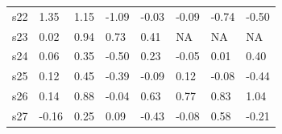 \begin{table}[]
\begin{tabular}{llllllll}
s22 & \cellcolor[HTML]{9B9B9B}1.35                                  & \cellcolor[HTML]{9B9B9B}1.15                                 & -1.09                                                                   & -0.03                        & -0.09                                                            & -0.74                                                                & -0.50                                                                      \\
s23 & \cellcolor[HTML]{EFEFEF}0.02                                  & \cellcolor[HTML]{9B9B9B}0.94                                 & \cellcolor[HTML]{9B9B9B}0.73                                            & \cellcolor[HTML]{C0C0C0}0.41 & NA                                                               & NA                                                                   & NA                                                                         \\
s24 & \cellcolor[HTML]{EFEFEF}0.06                                  & \cellcolor[HTML]{C0C0C0}0.35                                 & -0.50                                                                   & \cellcolor[HTML]{C0C0C0}0.23 & -0.05                                                            & \cellcolor[HTML]{EFEFEF}0.01                                         & \cellcolor[HTML]{C0C0C0}0.40                                               \\
s25 & \cellcolor[HTML]{C0C0C0}0.12                                  & \cellcolor[HTML]{C0C0C0}0.45                                 & -0.39                                                                   & -0.09                        & \cellcolor[HTML]{C0C0C0}0.12                                     & -0.08                                                                & -0.44                                                                      \\
s26 & \cellcolor[HTML]{C0C0C0}0.14                                  & \cellcolor[HTML]{9B9B9B}0.88                                 & -0.04                                                                   & \cellcolor[HTML]{9B9B9B}0.63 & \cellcolor[HTML]{9B9B9B}0.77                                     & \cellcolor[HTML]{9B9B9B}0.83                                         & \cellcolor[HTML]{9B9B9B}1.04                                               \\
s27 & -0.16                                                         & \cellcolor[HTML]{C0C0C0}0.25                                 & \cellcolor[HTML]{EFEFEF}0.09                                            & -0.43                        & -0.08                                                            & \cellcolor[HTML]{C0C0C0}0.58                                         & -0.21                                                                      \\

\end{tabular}
\end{table}

